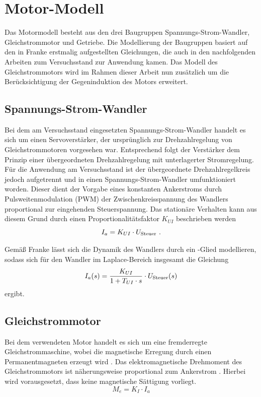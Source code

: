 \section{Motor-Modell}

Das Motormodell besteht aus den drei Baugruppen Spannungs-Strom-Wandler, Gleichstrommotor und Getriebe. Die Modellierung der Baugruppen basiert auf den in Franke \cite{franke} erstmalig aufgestellten Gleichungen, die auch in den nachfolgenden Arbeiten zum Versuchsstand zur Anwendung kamen. Das Modell des Gleichstrommotors wird im Rahmen dieser Arbeit nun zusätzlich um die Berücksichtigung der Gegeninduktion des Motors erweitert.

\subsection{Spannungs-Strom-Wandler}

Bei dem am Versuchsstand eingesetzten Spannungs-Strom-Wandler handelt es sich um einen Servoverstärker, der ursprünglich zur Drehzahlregelung von Gleichstrommotoren vorgesehen war. Entsprechend folgt der Verstärker dem Prinzip einer übergeordneten Drehzahlregelung mit unterlagerter Stromregelung. Für die Anwendung am Versuchsstand ist der übergeordnete Drehzahlregelkreis jedoch aufgetrennt und in einen Spannungs-Strom-Wandler umfunktioniert worden. Dieser dient der Vorgabe eines konstanten Ankerstroms durch Pulsweitenmodulation (PWM) der Zwischenkreisspannung des Wandlers proportional zur eingehenden Steuerspannung. Das stationäre Verhalten kann aus diesem Grund durch einen Proportionalitätsfaktor $K_{UI}$ beschrieben werden
	\[
	I_a = K_{UI} \cdot U_{\mathrm{Steuer}} \ .
\]

Gemäß Franke \cite{franke} lässt sich die Dynamik des Wandlers durch ein -Glied modellieren, sodass sich für den Wandler im Laplace-Bereich insgesamt die Gleichung
	\[
	I_a(s) = \frac{K_{UI}}{1+T_{UI} \cdot s} \cdot U_{\mathrm{Steuer}}(s)
	\]
ergibt.


\subsection{Gleichstrommotor}

Bei dem verwendeten Motor handelt es sich um eine fremderregte Gleichstrommaschine, wobei die magnetische Erregung durch einen Permanentmagneten erzeugt wird \cite{franke}. Das elektromagnetische Drehmoment des Gleichstrommotors ist näherungsweise proportional zum Ankerstrom \cite{binder}. Hierbei wird vorausgesetzt, dass keine magnetische Sättigung vorliegt.
\[
	M_e = K_I \cdot I_a
\]

